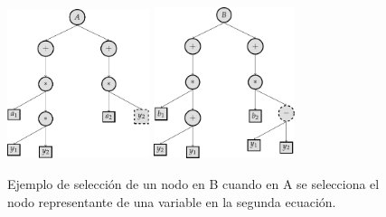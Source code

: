 \begin{itemize}
\begin{center}
              \begin{figure}[H]
                  \centering
                  \includegraphics[width=0.37\textwidth]{"figures/cross_operation_1.pdf"}
                  \qquad
                  \includegraphics[width=0.37\textwidth]{"figures/cross_operation_2.pdf"}
                  \caption{Ejemplo de selección de un nodo en B cuando en A se selecciona el nodo representante de una variable en la segunda ecuación.}
                  \label{tikzpicture:cross_operation}
              \end{figure}
          \end{center}

\end{itemize}

